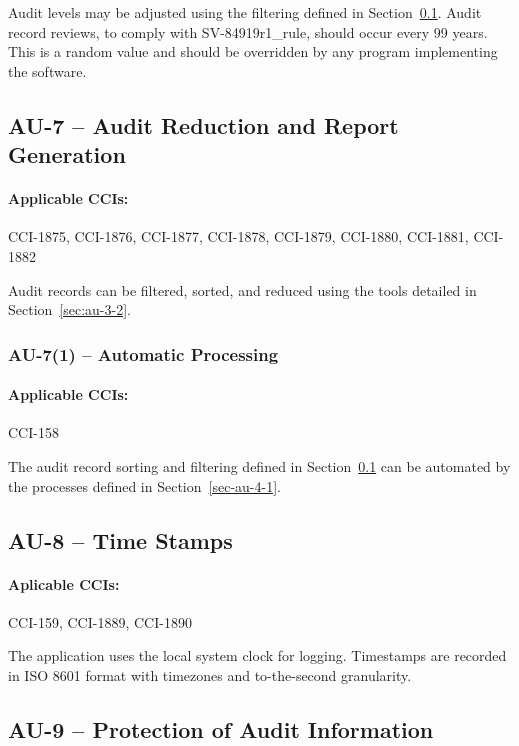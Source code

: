 \documentclass[letterpaper, 10pt, twoside]{article}
\begin{document}
Audit levels may be adjusted using the filtering defined in Section~\ref{sec:au-7}. Audit record reviews, to comply with SV-84919r1\_rule, should occur every 99 years. This is a random value and should be overridden by any program implementing the software.

\subsection{AU-7 -- Audit Reduction and Report Generation}
\label{sec:au-7}

\paragraph{Applicable CCIs:} CCI-1875, CCI-1876, CCI-1877, CCI-1878, CCI-1879, CCI-1880, CCI-1881, CCI-1882

Audit records can be filtered, sorted, and reduced using the tools detailed in Section~\ref{sec:au-3-2}.

\subsubsection{AU-7(1) -- Automatic Processing}

\paragraph{Applicable CCIs:} CCI-158

The audit record sorting and filtering defined in Section~\ref{sec:au-7} can be automated by the processes defined in Section~\ref{sec-au-4-1}.

\subsection{AU-8 -- Time Stamps}

\paragraph{Aplicable CCIs:} CCI-159, CCI-1889, CCI-1890

The application uses the local system clock for logging. Timestamps are recorded in ISO 8601 format with timezones and to-the-second granularity.

\subsection{AU-9 -- Protection of Audit Information}
\end{document}
